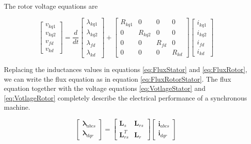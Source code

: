 The rotor voltage equations are

\begin{equation} \label{eq:VotlageRotor}
	\begin{bmatrix}
		v_{kq1} \\
		v_{kq2} \\
		v_{fd} \\
		v_{kd}
	\end{bmatrix}
	=
	\frac{d}{dt}
	\begin{bmatrix}
		\lambda_{kq1} \\
		\lambda_{kq2} \\
		\lambda_{fd} \\
		\lambda_{kd}
	\end{bmatrix}
	+
	\begin{bmatrix}
		R_{kq1} & 0 & 0 & 0 \\
		0 & R_{kq2} & 0 & 0 \\
		0 & 0 & R_{fd} & 0 \\
		0 & 0 & 0 & R_{kd}
	\end{bmatrix}
	\begin{bmatrix}
		i_{kq1} \\
		i_{kq2} \\
		i_{fd} \\
		i_{kd}
	\end{bmatrix}
\end{equation}

Replacing the inductances values in equations \ref{eq:FluxStator} and \ref{eq:FluxRotor}, we can write the flux equation as in equation \ref{eq:FluxRotorStator}. The flux equation together with the voltage equations \ref{eq:VotlageStator} and \ref{eq:VotlageRotor} completely describe the electrical performance of a synchronous machine.

\begin{equation} \label{eq:FluxRotorStator}
	\begin{bmatrix}
		\boldsymbol{\lambda}_{abcs} \\
		\boldsymbol{\lambda}_{dqr}
	\end{bmatrix}
	=
	\begin{bmatrix}
		\mathbf{L}_s & \mathbf{L}_{rs} \\
		\mathbf{L}_{rs}^{T} & \mathbf{L}_r
	\end{bmatrix}
	\begin{bmatrix}
		\mathbf{i}_{abcs} \\
		\mathbf{i}_{dqr}
	\end{bmatrix}
\end{equation}

